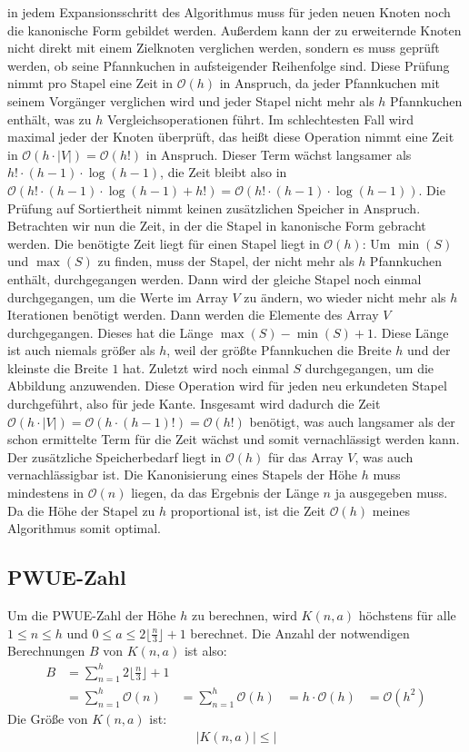 \documentclass[a4paper,10pt,ngerman]{scrartcl}
\begin{document}
in jedem Expansionsschritt des Algorithmus muss für jeden neuen Knoten noch die kanonische Form gebildet werden. Außerdem kann der zu erweiternde Knoten nicht direkt
mit einem Zielknoten verglichen werden, sondern es muss geprüft werden, ob seine Pfannkuchen in aufsteigender Reihenfolge sind. Diese Prüfung nimmt pro Stapel eine Zeit in
$\mathcal{O}(h)$ in Anspruch, da jeder Pfannkuchen mit seinem Vorgänger verglichen wird und jeder Stapel nicht mehr als $h$ Pfannkuchen enthält, was zu $h$ Vergleichsoperationen führt.
Im schlechtesten Fall wird maximal jeder der Knoten überprüft, das heißt diese Operation nimmt eine Zeit in $\mathcal{O}(h \cdot |V|) = \mathcal{O}(h!)$ in Anspruch. Dieser Term
wächst langsamer als $h! \cdot (h-1) \cdot \log (h-1)$, die Zeit bleibt also in $\mathcal{O}(h! \cdot (h-1) \cdot \log (h-1) + h!) = \mathcal{O}(h! \cdot (h-1) \cdot \log (h-1))$. Die
Prüfung auf Sortiertheit nimmt keinen zusätzlichen Speicher in Anspruch.\\
Betrachten wir nun die Zeit, in der die Stapel in kanonische Form gebracht werden. Die benötigte Zeit liegt für einen Stapel liegt in $\mathcal{O}(h)$: Um $\min(S)$ und $\max(S)$ zu finden, muss der 
Stapel, der nicht mehr als $h$ Pfannkuchen enthält, durchgegangen werden. Dann wird der gleiche Stapel noch einmal durchgegangen, um die Werte im Array $V$ zu ändern, wo wieder nicht mehr als
$h$ Iterationen benötigt werden. Dann werden die Elemente des Array $V$ durchgegangen. Dieses hat die Länge $\max(S) - \min(S) + 1$. Diese Länge ist auch niemals größer als $h$, weil 
der größte Pfannkuchen die Breite $h$ und der kleinste die Breite $1$ hat. Zuletzt wird noch einmal $S$ durchgegangen, um die Abbildung anzuwenden. Diese Operation wird für jeden neu
erkundeten Stapel durchgeführt, also für jede Kante. Insgesamt wird dadurch die Zeit $\mathcal{O}(h \cdot |V|) = \mathcal{O}(h \cdot (h-1)!) = \mathcal{O}(h!)$ benötigt, was auch langsamer
als der schon ermittelte Term für die Zeit wächst und somit vernachlässigt werden kann. Der zusätzliche Speicherbedarf liegt in $\mathcal{O}(h)$ für das Array $V$, was auch vernachlässigbar ist.
Die Kanonisierung eines Stapels der Höhe $h$ muss mindestens in $\mathcal{O}(n)$ liegen, da das Ergebnis der Länge $n$ ja ausgegeben muss. Da die Höhe der Stapel zu $h$ proportional ist,
ist die Zeit $\mathcal{O}(h)$ meines Algorithmus somit optimal.
\subsection{PWUE-Zahl}
Um die PWUE-Zahl der Höhe $h$ zu berechnen, wird $K(n,a)$ höchstens für alle $1 \leq n \leq h$ und $0 \leq a \leq 2\lfloor\frac{n}{3}\rfloor+1$ berechnet. Die Anzahl der notwendigen
Berechnungen $B$ von $K(n, a)$ ist also:
\begin{align*}
  B &= \sum_{n=1}^{h}2\lfloor\frac{n}{3}\rfloor+1 \\
    &= \sum_{n=1}^{h}\mathcal{O}(n)
    &= \sum_{n=1}^{h}\mathcal{O}(h)
    &= h \cdot \mathcal{O}(h)
    &= \mathcal{O}(h^2)
\end{align*}
Die Größe von $K(n, a)$ ist:
\begin{align*}
  |K(n, a)| \leq |
\end{align*}
\end{document}
